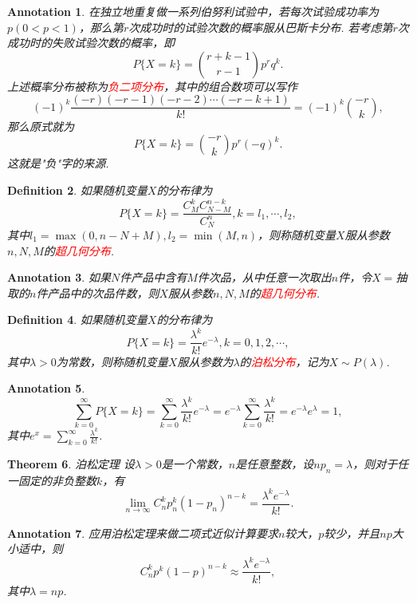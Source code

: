 \documentclass{article}
\newtheorem{theorem}{Theorem}[section]
\newtheorem{definition}[theorem]{Definition}
\newtheorem{annotation}[theorem]{Annotation}
\newcommand{\redt}[1]{\textcolor{red}{#1}}
\begin{document}
\begin{annotation}
\rm 在独立地重复做一系列伯努利试验中，若每次试验成功率为$p(0 < p < 1)$，那么第$r$次成功时的试验次数的概率服从巴斯卡分布. 若考虑第$r$次成功时的失败试验次数的概率，即
$$
P\{X = k\} = \binom{r+k-1}{r-1}p^{r}q^{k}.
$$
上述概率分布被称为\redt{负二项分布}，其中的组合数项可以写作
$$
(-1)^{k}{\frac {(-r)(-r-1)(-r-2)\dotsm (-r-k+1)}{k!}}=(-1)^{k}{\binom {-r}{k}},
$$
那么原式就为
$$
P\{X = k\} = \binom {-r}{k} p^r(-q)^k. 
$$
这就是"负"字的来源. 
\end{annotation}

\begin{definition}
\rm 如果随机变量$X$的分布律为
$$
P\{X=k\} = \frac{C_M^kC_{N-M}^{n-k}}{C_{N}^n}, k=l_1,\cdots,l_2,
$$
其中$l_1 = \max(0,n-N+M), l_2 = \min(M,n)$，则称随机变量$X$服从参数$n,N,M$的\redt{超几何分布}.
\end{definition}

\begin{annotation}
\rm 如果$N$件产品中含有$M$件次品，从中任意一次取出$n$件，令$X=$抽取的$n$件产品中的次品件数，则$X$服从参数$n,N,M$的\redt{超几何分布}. 
\end{annotation}

\begin{definition}
\rm 如果随机变量$X$的分布律为
$$
P\{X=k\} = \frac{\lambda^k}{k!}e^{-\lambda}, k = 0,1,2,\cdots,
$$
其中$\lambda > 0$为常数，则称随机变量$X$服从参数为$\lambda$的\redt{泊松分布}，记为$X \sim P(\lambda)$. 
\end{definition}

\begin{annotation}
\rm 
$$
\sum\limits_{k=0}^{\infty} P\{X =k\} = \sum\limits_{k=0}^{\infty}\frac{\lambda^k}{k!}e^{-\lambda} = e^{-\lambda}\sum\limits_{k=0}^{\infty}\frac{\lambda^k}{k!} = e^{-\lambda}e^{\lambda} = 1,
$$
其中$e^x = \sum\limits_{k=0}^{\infty}\frac{\lambda^k}{k!}$.
\end{annotation}

\begin{theorem}
\rm {\color{red} 泊松定理} 设$\lambda > 0$是一个常数，$n$是任意整数，设$np_n = \lambda$，则对于任一固定的非负整数$k$，有
$$
\lim\limits_{n \rightarrow \infty}C_n^kp_n^k(1-p_n)^{n-k} = \frac{\lambda^ke^{-\lambda}}{k!}.
$$
\end{theorem}

\begin{annotation}
\rm 应用泊松定理来做二项式近似计算要求$n$较大，$p$较少，并且$np$大小适中，则
$$
C_n^kp^k(1-p)^{n-k} \approx \frac{\lambda^ke^{-\lambda}}{k!},
$$
其中$\lambda = np$.
\end{annotation}
\end{document}
